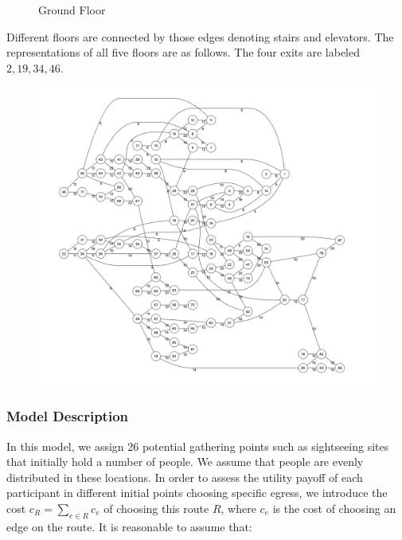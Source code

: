 \documentclass{mcmthesis}
\begin{document}
	\begin{figure} 
		\centering 
		\hspace{0.2in} 
		\caption{Ground Floor} 
		\label{fig:subfig_gd} %
	\end{figure}
	
	Different floors are connected by those edges denoting stairs and elevators. The representations of all five floors are as follows.  The four exits are labeled $2, 19, 34, 46$.
	\begin{figure}
		\centering
		\includegraphics[width=0.8\linewidth]{../../Figure/graph_whole}
		\caption{}
		\label{fig:graphwhole}
	\end{figure}
	
	\subsubsection{Model Description}
	In this model, we assign 26 potential gathering points such as sightseeing sites that initially hold a  number of people. We assume that people  are evenly distributed in these locations. In order to assess the utility payoff of each participant in different initial points choosing specific egress, we introduce the cost $c_R = \sum\limits_{e \in R} c_e$ of choosing this route $R$, where $c_e$ is the cost of choosing an edge on the route. 
	It is reasonable to assume that:
	
\end{document}
